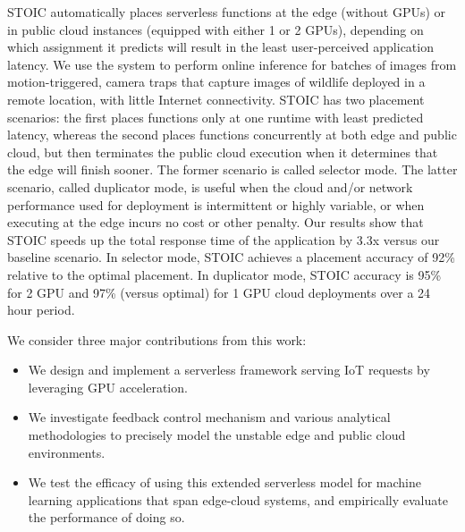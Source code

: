 STOIC automatically places serverless functions at the edge (without GPUs) or in public
cloud instances (equipped with either 1 or 2 GPUs), depending on which
assignment it
predicts will result in the least user-perceived application latency. 
We use the system to perform online
inference for batches of images from motion-triggered, camera traps that
capture images of wildlife deployed in a remote location, with little Internet
connectivity.
STOIC has two placement scenarios: the first
places functions only at one runtime with least predicted latency, whereas the
second places functions concurrently at both edge and public cloud, but then
terminates the public cloud execution when it determines that the edge will
finish sooner.
The former scenario
is called selector mode. The latter scenario, called duplicator mode, is
useful when the cloud and/or network performance used for deployment is
intermittent or highly variable, or when executing at the edge incurs no
cost or other penalty. Our results show that STOIC speeds up the total response time of the
application by 3.3x versus our baseline scenario. In selector mode, STOIC
achieves a placement accuracy of 92\% relative to the optimal placement.  In duplicator mode, STOIC accuracy is
95\% for 2 GPU and 97\% (versus optimal) for 1 GPU cloud deployments over a 24 hour period.

We consider three major contributions from this work: 
\begin{itemize}
\item We design and
implement a serverless framework serving IoT requests by leveraging GPU
acceleration. 
\item We investigate feedback control mechanism and various
analytical methodologies to precisely model the unstable edge and public cloud
environments. 
\item We test the efficacy of using this extended serverless model
for machine learning applications that span edge-cloud systems, and
empirically evaluate the performance of doing so. 
\end{itemize}

